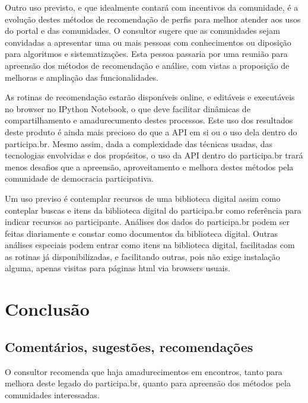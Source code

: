 \documentclass[12pt]{article}
\begin{document}
Outro uso previsto, e que idealmente contará com incentivos da comunidade, é a evolução destes métodos de recomendação de perfis para melhor atender aos usos do portal e das comunidades. O consultor sugere que as comunidades sejam convidadas a apresentar uma ou mais pessoas com conhecimentos ou diposição para algoritmos e sistematizações. Esta pessoa passaria por uma reunião para apreensão dos métodos de recomendação e análise, com vistas a proposição de melhoras e ampliação das funcionalidades.

As rotinas de recomendação estarão disponíveis online, e editáveis e executáveis no browser no IPython Notebook, o que deve facilitar dinâmicas de compartilhamento e amadurecumento destes processos. Este uso dos resultados deste produto é ainda mais precioso do que a API em si ou o uso dela dentro do participa.br. Mesmo assim, dada a complexidade das técnicas usadas, das tecnologias envolvidas e dos propósitos, o uso da API dentro do participa.br trará menos desafios que a apreensão, aproveitamento e melhora destes métodos pela comunidade de democracia participativa.

Um uso previso é contemplar recursos de uma biblioteca digital assim como conteplar buscas e itens da biblioteca digital do participa.br como referência para indicar recursos ao participante. Análises dos dados do participa.br podem ser feitas diariamente e constar como documentos da biblioteca digital. Outras análises especiais podem entrar como itens na biblioteca digital, facilitadas com as rotinas já disponibilizadas, e facilitando outras, pois não exige instalação alguma, apenas visitas para páginas html via browsers usuais.

\section{Conclusão}
\subsection{Comentários, sugestões, recomendações}
O consultor recomenda que haja amadurecimentos em encontros, tanto para melhora deste legado do participa.br, quanto para apreensão dos métodos pela comunidades interessadas. 
\end{document}
